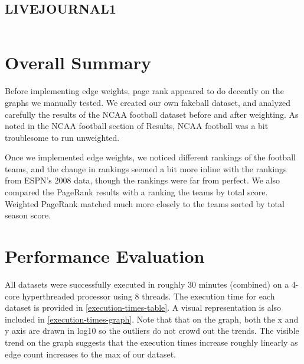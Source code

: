 \documentclass{report}
\newcommand{\results}[1]{{\ttfamily \begin{longtabu}{rll}
                           
                         \end{longtabu}\clearpage}}
\newcommand{\pagerank}{PageRank }
\begin{document}
\subsection{LIVEJOURNAL1}
\results{soc-LiveJournal1-results.tex}

\section{Overall Summary}
Before implementing edge weights, page rank appeared to do decently on the
graphs we manually tested. We created our own fakeball dataset, and analyzed
carefully the results of the NCAA football dataset before and after weighting.
As noted in the NCAA football section of Results, NCAA football was a bit
troublesome to run unweighted.

Once we implemented edge weights, we noticed different rankings of the football
teams, and the change in rankings seemed a bit more inline with the rankings
from ESPN's 2008 data, though the rankings were far from perfect. We also
compared the \pagerank results with a ranking the teams by total score. Weighted
\pagerank matched much more closely to the teams sorted by total season score.

\section{Performance Evaluation}
All datasets were successfully executed in roughly 30 minutes (combined) on a 4-core hyperthreaded processor using 8 threads. The execution time for each dataset is provided in \cref{execution-times-table}. A visual representation is also included in \cref{execution-times-graph}. Note that that on the graph, both the x and y axis are drawn in log10 so the outliers do not crowd out the trends. The visible trend on the graph suggests that the execution times increase roughly linearly as edge count increases to the max of our dataset.  
\end{document}
